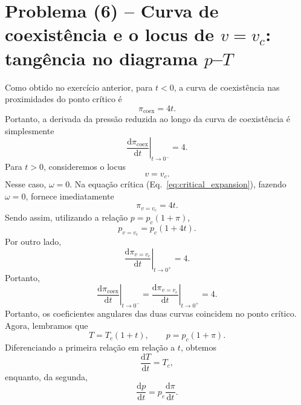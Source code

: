 \documentclass[11pt,a4paper]{article}
\renewcommand{\dd}{\mathrm{d}}
\begin{document}
\section*{Problema (6) -- Curva de coexistência e o locus de $v=v_c$: tangência no diagrama $p$--$T$}
%
Como obtido no exercício anterior, para $t<0$, a curva de coexistência nas proximidades do ponto crítico é
%
\begin{equation}
    \pi_{\mathrm{coex}}
    =
    4t.
\end{equation}
%
Portanto, a derivada da pressão reduzida ao longo da curva de coexistência é simplesmente
%
\begin{equation}
    \boxed{
    \left.
    \frac{\dd\pi_{\mathrm{coex}}}{\dd t}
    \right|_{t\to0^-}
    =4.
    }
\label{eq:derivative_coex}
\end{equation}
%
Para $t>0$, consideremos o locus
%
\begin{equation}
    v=v_c.
\end{equation}
%
Nesse caso, $\omega=0$. Na equação crítica (Eq.~\ref{eq:critical_expansion}), fazendo $\omega = 0$, fornece imediatamente
%
\begin{equation}
    \pi_{v=v_c}=4t.
\end{equation}
%
Sendo assim, utilizando a relação $p=p_c(1+\pi)$, 
%
\begin{equation}
    p_{v=v_c}
    =
    p_c(1+4t).
    \label{eq:locus}
\end{equation}
%
Por outro lado,
%
\begin{equation}
    \boxed{
    \left.
    \frac{\dd\pi_{v=v_c}}{\dd t}
    \right|_{t\to0^+}
    =4.
    }
\label{eq:derivative_vc}
\end{equation}
%
Portanto,
%
\begin{equation}
    \left.
    \frac{\dd\pi_{\mathrm{coex}}}{\dd t}
    \right|_{t\to0^-}
    =
    \left.
    \frac{\dd\pi_{v=v_c}}{\dd t}
    \right|_{t\to0^+}
    =4.
\end{equation}
%
Portanto, os coeficientes angulares das duas curvas coincidem no ponto crítico. Agora, lembramos que
%
\begin{equation}
    T=T_c(1+t),
    \qquad
    p=p_c(1+\pi).
\end{equation}
%
Diferenciando a primeira relação em relação a $t$, obtemos
%
\begin{equation}
    \frac{\dd T}{\dd t}=T_c,
\end{equation}
%
enquanto, da segunda,
%
\begin{equation}
    \frac{\dd p}{\dd t}
    =
    p_c\frac{\dd\pi}{\dd t}.
\end{equation}
\end{document}
